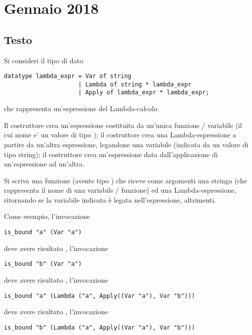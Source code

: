 \section{Gennaio 2018}

\subsection*{Testo}

Si consideri il tipo di dato

\begin{lstlisting}
datatype lambda_expr = Var of string
					 | Lambda of string * lambda_expr
					 | Apply of lambda_expr * lambda_expr;
\end{lstlisting}

che rappresenta un'espressione del Lambda-calcolo.

Il costruttore  crea un'espressione costituita da un'unica funzione / variabile (il cui nome e' un valore di tipo );
il costruttore  crea una Lambda-espressione a partire da un'altra espressione, legandone una variabile (indicata da un valore di tipo string);
il costruttore  crea un'espressione data dall'applicazione di un'espressione ad un'altra.

Si scriva una funzione  (avente tipo ) che riceve come argomenti una stringa (che rappresenta il nome di una variabile / funzione) ed una Lambda-espressione,
ritornando  se la variabile indicata è legata nell'espressione,  altrimenti.

\medskip
Come esempio, l'invocazione

\begin{lstlisting}
is_bound "a" (Var "a")
\end{lstlisting}

deve avere risultato , l'invocazione

\begin{lstlisting}
is_bound "b" (Var "a")
\end{lstlisting}

deve avere risultato , l'invocazione

\begin{lstlisting}
is_bound "a" (Lambda ("a", Apply((Var "a"), Var "b")))
\end{lstlisting}

deve avere risultato , l'invocazione

\begin{lstlisting}
is_bound "b" (Lambda ("a", Apply((Var "a"), Var "b")))
\end{lstlisting}

